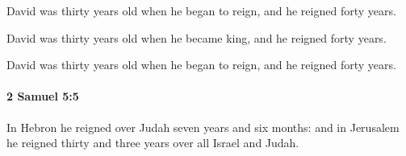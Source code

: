			\begin{versebox}
					\item[BHS] 
					\item[ASV] David was thirty years old when he began to reign, and he reigned forty years.
					\item[NIV] David was thirty years old when he became king, and he reigned forty years.
					\item[NRSV] David was thirty years old when he began to reign, and he reigned forty years.
			\end{versebox}

		\paragraph{2 Samuel 5:5} %
			\label{2SAMUEL-5-5}

			In Hebron he reigned over Judah seven years and six months: and in Jerusalem he reigned thirty and three years over all Israel and Judah.

